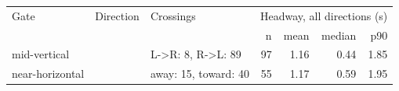 \begin{tabular}{@{}lllrrrr@{}}
\toprule
Gate & Direction & Crossings & \multicolumn{4}{c}{Headway, all directions (s)} \\
 & & & n & mean & median & p90 \\
\midrule
mid-vertical &  & L->R: 8, R->L: 89 & 97 & 1.16 & 0.44 & 1.85 \\
near-horizontal &  & away: 15, toward: 40 & 55 & 1.17 & 0.59 & 1.95 \\
\bottomrule
\end{tabular}
